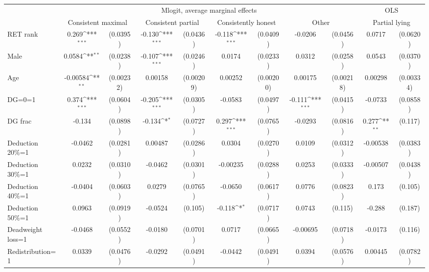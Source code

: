 \def\sym#1{\ifmmode^{#1}\else\(^{#1}\)\fi}
\begin{tabular}{l|cccccccc|cc}
\hline\hline
&\multicolumn{8}{c|}{Mlogit, average marginal effects }&\multicolumn{2}{c}{OLS}\\
                &\multicolumn{2}{c}{Consistent maximal}&\multicolumn{2}{c}{Consistent partial}&\multicolumn{2}{c}{Consistently honest}&\multicolumn{2}{c}{Other}   &\multicolumn{2}{c}{Partial lying}\\
\hline
RET rank        &    0.269\sym{***}& (0.0395)&   -0.130\sym{***}& (0.0436)&   -0.118\sym{***}& (0.0409)&  -0.0206         & (0.0456)&   0.0717         & (0.0620)\\
Male            &   0.0584\sym{**} & (0.0238)&   -0.107\sym{***}& (0.0246)&   0.0174         & (0.0233)&   0.0312         & (0.0258)&   0.0543         & (0.0370)\\
Age             & -0.00584\sym{**} &(0.00232)&  0.00158         &(0.00209)&  0.00252         &(0.00200)&  0.00175         &(0.00218)&  0.00298         &(0.00334)\\
DG=0=1          &    0.374\sym{***}& (0.0604)&   -0.205\sym{***}& (0.0305)&  -0.0583         & (0.0497)&   -0.111\sym{***}& (0.0415)&  -0.0733         & (0.0858)\\
DG frac         &   -0.134         & (0.0898)&   -0.134\sym{*}  & (0.0727)&    0.297\sym{***}& (0.0765)&  -0.0293         & (0.0816)&    0.277\sym{**} &  (0.117)\\
Deduction 20\%=1&  -0.0462         & (0.0281)&  0.00487         & (0.0286)&   0.0304         & (0.0270)&   0.0109         & (0.0312)& -0.00538         & (0.0383)\\
Deduction 30\%=1&   0.0232         & (0.0310)&  -0.0462         & (0.0301)& -0.00235         & (0.0288)&   0.0253         & (0.0333)& -0.00507         & (0.0438)\\
Deduction 40\%=1&  -0.0404         & (0.0603)&   0.0279         & (0.0765)&  -0.0650         & (0.0617)&   0.0776         & (0.0823)&    0.173         &  (0.105)\\
Deduction 50\%=1&   0.0963         & (0.0919)&  -0.0524         &  (0.105)&   -0.118\sym{*}  & (0.0717)&   0.0743         &  (0.115)&   -0.288         &  (0.187)\\
Deadweight loss=1&  -0.0468         & (0.0552)&  -0.0180         & (0.0701)&   0.0717         & (0.0665)& -0.00695         & (0.0718)&  -0.0173         &  (0.116)\\
Redistribution=1&   0.0339         & (0.0476)&  -0.0292         & (0.0491)&  -0.0442         & (0.0491)&   0.0394         & (0.0576)&  0.00445         & (0.0782)\\

\end{tabular}
